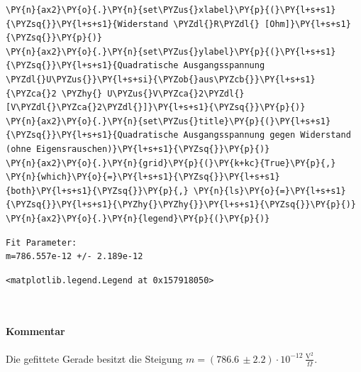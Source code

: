 \begin{tcolorbox}[breakable, size=fbox, boxrule=1pt, pad at break*=1mm,colback=cellbackground, colframe=cellborder]
\begin{Verbatim}[commandchars=\\\{\}]
\PY{n}{ax2}\PY{o}{.}\PY{n}{set\PYZus{}xlabel}\PY{p}{(}\PY{l+s+s1}{\PYZsq{}}\PY{l+s+s1}{Widerstand \PYZdl{}R\PYZdl{} [Ohm]}\PY{l+s+s1}{\PYZsq{}}\PY{p}{)}
\PY{n}{ax2}\PY{o}{.}\PY{n}{set\PYZus{}ylabel}\PY{p}{(}\PY{l+s+s1}{\PYZsq{}}\PY{l+s+s1}{Quadratische Ausgangsspannung \PYZdl{}U\PYZus{}}\PY{l+s+si}{\PYZob{}aus\PYZcb{}}\PY{l+s+s1}{\PYZca{}2 \PYZhy{} U\PYZus{}V\PYZca{}2\PYZdl{} [V\PYZdl{}\PYZca{}2\PYZdl{}]}\PY{l+s+s1}{\PYZsq{}}\PY{p}{)}
\PY{n}{ax2}\PY{o}{.}\PY{n}{set\PYZus{}title}\PY{p}{(}\PY{l+s+s1}{\PYZsq{}}\PY{l+s+s1}{Quadratische Ausgangsspannung gegen Widerstand (ohne Eigensrauschen)}\PY{l+s+s1}{\PYZsq{}}\PY{p}{)}
\PY{n}{ax2}\PY{o}{.}\PY{n}{grid}\PY{p}{(}\PY{k+kc}{True}\PY{p}{,} \PY{n}{which}\PY{o}{=}\PY{l+s+s1}{\PYZsq{}}\PY{l+s+s1}{both}\PY{l+s+s1}{\PYZsq{}}\PY{p}{,} \PY{n}{ls}\PY{o}{=}\PY{l+s+s1}{\PYZsq{}}\PY{l+s+s1}{\PYZhy{}\PYZhy{}}\PY{l+s+s1}{\PYZsq{}}\PY{p}{)}
\PY{n}{ax2}\PY{o}{.}\PY{n}{legend}\PY{p}{(}\PY{p}{)}
\end{Verbatim}
\end{tcolorbox}

    \begin{Verbatim}[commandchars=\\\{\}]
Fit Parameter:
m=786.557e-12 +/- 2.189e-12
    \end{Verbatim}

            \begin{tcolorbox}[breakable, size=fbox, boxrule=.5pt, pad at break*=1mm, opacityfill=0]
\begin{Verbatim}[commandchars=\\\{\}]
<matplotlib.legend.Legend at 0x157918050>
\end{Verbatim}
\end{tcolorbox}
        
    \begin{center}
    \end{center}
    { \hspace*{\fill} \\}
    
    \hypertarget{kommentar}{%
\paragraph{Kommentar}\label{kommentar}}

Die gefittete Gerade besitzt die Steigung
\(m = (786.6\,\pm 2.2) \cdot 10^{-12} \,\frac{\text{V}^2}{\Omega}\).

